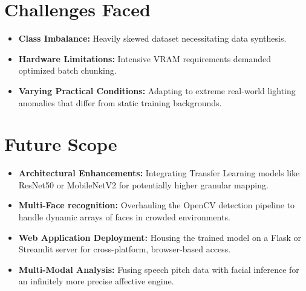 \documentclass[12pt,a4paper]{report}
\begin{document}
\section{Challenges Faced}
\begin{itemize}
    \item \textbf{Class Imbalance:} Heavily skewed dataset necessitating data synthesis.
    \item \textbf{Hardware Limitations:} Intensive VRAM requirements demanded optimized batch chunking.
    \item \textbf{Varying Practical Conditions:} Adapting to extreme real-world lighting anomalies that differ from static training backgrounds.
\end{itemize}

\section{Future Scope}
\begin{itemize}
    \item \textbf{Architectural Enhancements:} Integrating Transfer Learning models like ResNet50 or MobileNetV2 for potentially higher granular mapping.
    \item \textbf{Multi-Face recognition:} Overhauling the OpenCV detection pipeline to handle dynamic arrays of faces in crowded environments.
    \item \textbf{Web Application Deployment:} Housing the trained model on a Flask or Streamlit server for cross-platform, browser-based access.
    \item \textbf{Multi-Modal Analysis:} Fusing speech pitch data with facial inference for an infinitely more precise affective engine.
\end{itemize}
\lipsum[191-200]
\end{document}
